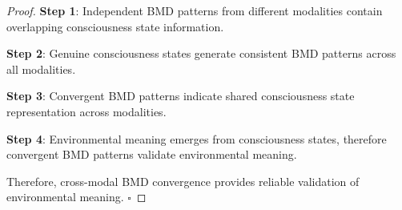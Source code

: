 \documentclass[12pt,a4paper]{article}
\begin{document}
\begin{proof}
\textbf{Step 1}: Independent BMD patterns from different modalities contain overlapping consciousness state information.

\textbf{Step 2}: Genuine consciousness states generate consistent BMD patterns across all modalities.

\textbf{Step 3}: Convergent BMD patterns indicate shared consciousness state representation across modalities.

\textbf{Step 4}: Environmental meaning emerges from consciousness states, therefore convergent BMD patterns validate environmental meaning.

Therefore, cross-modal BMD convergence provides reliable validation of environmental meaning. $\square$
\end{proof}
\end{document}
